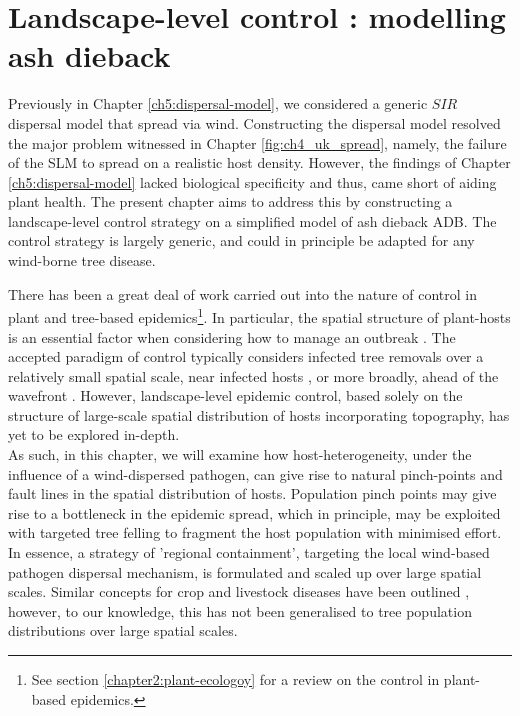 \chapter{Landscape-level control : modelling ash dieback}


Previously in Chapter \ref{ch5:dispersal-model}, we considered a generic $SIR$ dispersal model that spread via wind. Constructing the dispersal model resolved the major problem witnessed in Chapter \ref{fig:ch4_uk_spread}, namely, the failure of the SLM to spread on a realistic host density. However, the findings of Chapter \ref{ch5:dispersal-model} lacked biological specificity and thus, came short of aiding plant health. The present chapter aims to address this by constructing a landscape-level control strategy on a simplified model of ash dieback ADB. The control strategy is largely generic, and could in principle be adapted for any wind-borne tree disease.

There has been a great deal of work carried out into the nature of control in plant and tree-based epidemics\footnote{See section \ref{chapter2:plant-ecologoy} for a review on the control in plant-based epidemics.}. In particular, the spatial structure of plant-hosts is an essential factor when considering how to manage an outbreak \cite{spatial-control-optimisation, control-heterogeneous-landscapes}. The accepted paradigm of control typically considers infected tree removals over a relatively small spatial scale, near infected hosts \cite{WEBIDEMICS}, or more broadly, ahead of the wavefront \cite{large-scale-control}. However, landscape-level epidemic control, based solely on the structure of large-scale spatial distribution of hosts incorporating topography, has yet to be explored in-depth.\\

As such, in this chapter, we will examine how host-heterogeneity, under the influence of a wind-dispersed pathogen, can give rise to natural pinch-points and fault lines in the spatial distribution of hosts. Population pinch points may give rise to a bottleneck in the epidemic spread, which in principle, may be exploited with targeted tree felling to fragment the host population with minimised effort. In essence, a strategy of 'regional containment', targeting the local wind-based pathogen dispersal mechanism, is formulated and scaled up over large spatial scales. Similar concepts for crop and livestock diseases have been outlined \cite{PAPAIX201435, GILIOLI20131, Gilligan-disease-management}, however, to our knowledge, this has not been generalised to tree population distributions over large spatial scales.

